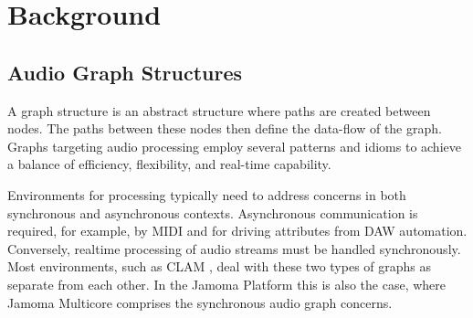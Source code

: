 \documentclass[twoside,a4paper]{article}
\begin{document}

%
%  
%





\section{Background} %



\subsection{Audio Graph Structures} %

A graph structure is an abstract structure where paths are created between nodes. %
 The paths between these nodes then define the data-flow of the graph.  Graphs targeting audio processing employ several patterns and idioms to achieve a balance of efficiency, flexibility, and real-time capability.

Environments for processing typically need to address concerns in both synchronous and asynchronous contexts.  Asynchronous communication is required, for example, by MIDI and for driving attributes from DAW automation.  Conversely, realtime processing of audio streams must be handled synchronously.  Most environments, such as CLAM  \cite{Amatraian:2007}, deal with these two types of graphs as separate from each other.  In the Jamoma Platform this is also the case, where Jamoma Multicore comprises the synchronous audio graph concerns.
\end{document}
